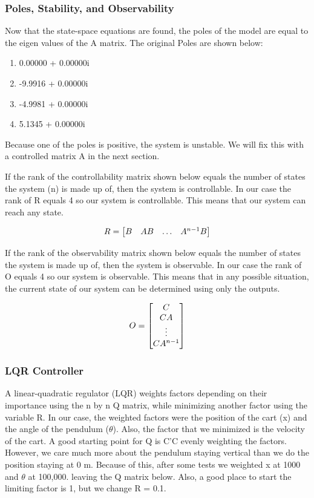 \documentclass{article}
\begin{document}
\subsubsection{Poles, Stability, and Observability}
Now that the state-space equations are found, the poles of the model are equal to the eigen values of the A matrix. The original Poles are shown below:
\begin{enumerate}
  \item   0.00000 + 0.00000i
  \item -9.9916 + 0.00000i
  \item -4.9981 + 0.00000i
  \item 5.1345 + 0.00000i
\end{enumerate}
Because one of the poles is positive, the system is unstable. We will fix this with a controlled matrix A in the next section.

If the rank of the controllability matrix shown below equals the number of states the system (n) is made up of, then the system is controllable. In our case the rank of R equals 4 so our system is controllable. This means that our system can reach any state.

\begin{equation} 
\label{ctrb}
\centering
R = \begin{bmatrix}
	B&AB&\hdots&A^{n-1}B\\
	\end{bmatrix}
\end{equation}
 
 If the rank of the observability matrix shown below equals the number of states the system is made up of, then the system is observable. In our case the rank of O equals 4 so our system is observable. This means that in any possible situation, the current state of our system can be determined using only the outputs.
 
 \begin{equation} 
\label{obsv}
\centering
O = \begin{bmatrix}
	C\\
	CA\\
	\vdots\\
	CA^{n-1}\\
	\end{bmatrix}
\end{equation}

\subsubsection{LQR Controller}
A linear-quadratic regulator (LQR) weights factors depending on their importance using the n by n Q matrix, while minimizing another factor using the variable R. In our case, the weighted factors were the position of the cart (x) and the angle of the pendulum ($\theta$). Also, the factor that we minimized is the velocity of the cart. A good starting point for Q is C'C evenly weighting the factors. However, we care much more about the pendulum staying vertical than we do the position staying at 0 m. Because of this, after some tests we weighted x at 1000 and $\theta$ at 100,000. leaving the Q matrix below. Also, a good place to start the limiting factor is 1, but we change R = 0.1.
\end{document}
